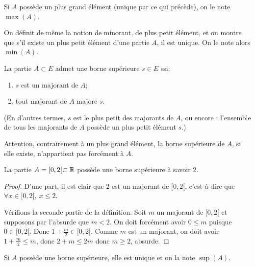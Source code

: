 Si $A$ possède un plus grand élément (unique par ce qui précède), on le note $\max(A)$.


On définit de même  la notion de minorant, de plus petit élément, et on montre que s'il existe un plus petit élément d'une partie $A$, il est unique. On le note alors $\min(A)$.

\begin{definition} La partie $A\subset E$ admet une borne supérieure $s\in E$ ssi:
\begin{enumerate}
\item $s$ est un majorant de $A$;
\item tout majorant de $A$ majore $s$.
\end{enumerate}
(En d'autres termes, $s$ est le plus petit des majorants de $A$, ou encore : l'ensemble de tous les majorants de $A$ possède un plus petit élément $s$.)
\end{definition}

Attention, contrairement à un plus grand élément, la borne supérieure de $A$, si elle existe, n'appartient pas forcément à $A$. 
\begin{exemple}
La partie $A=[0,2[ \subset \mathbb{R}$ possède une borne supérieure à savoir $2$.
\end{exemple}
\begin{proof}
D'une part, il est clair que $2$ est un majorant de $[0,2[$, c'est-à-dire que $\forall x\in [0,2[, \: x\leq 2$.

Vérifions la seconde partie de la définition.  Soit $m$ un majorant de $[0,2[$ et supposons par l'absurde que $m < 2$. On doit forcément avoir $0\leq m$ puisque $0\in [0,2[$. Donc $1+\frac{m}{2} \in [0,2[$. Comme $m$ est un majorant, on doit avoir $1+\frac{m}{2}\leq m$, donc $2+m\leq 2m$ donc $m\geq 2$, absurde.
\end{proof}

\begin{proposition}
Si $A$ possède une borne supérieure, elle est unique et on la note $\sup(A)$.
\end{proposition}